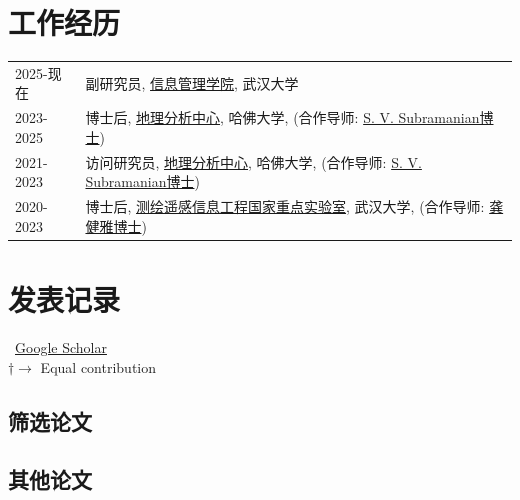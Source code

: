 \documentclass[11pt]{article}
\begin{document}
\section*{工作经历}
\label{exp_research}

\begin{longtable}[l]{@{}p{} p{}}

	2025-现在   & 副研究员, \href{https://sim.whu.edu.cn/}{信息管理学院}, 武汉大学                                                                                       \\

	2023-2025 & 博士后, \href{https://gis.harvard.edu/}{地理分析中心}, 哈佛大学, (合作导师: \href{https://gis.harvard.edu/people/s-v-subramanian}{S. V. Subramanian博士})   \\

	2021-2023 & 访问研究员, \href{https://gis.harvard.edu/}{地理分析中心}, 哈佛大学, (合作导师: \href{https://gis.harvard.edu/people/s-v-subramanian}{S. V. Subramanian博士}) \\

	2020-2023 & 博士后, \href{http://www.lmars.whu.edu.cn/en/}{测绘遥感信息工程国家重点实验室}, 武汉大学, (合作导师: \href{https://en.whu.edu.cn/info/1073/1568.htm}{龚健雅博士})       \\
\end{longtable}

\section*{发表记录}
\label{pubs}

\vspace{-.75em}
\small
{}~\href{https://scholar.google.com.hk/citations?user=H9RAbHIAAAAJ}{Google Scholar}\\
$\dagger \rightarrow$ Equal contribution
\normalsize

\subsection*{筛选论文}
\label{select-paper}
\newrefcontext[labelprefix=S]
\nocite{*}
\printbibliography[type=article, heading=none, resetnumbers=true, keyword=S]

\subsection*{其他论文}
\label{journal-article}
\newrefcontext[labelprefix=J]
\nocite{*}
\printbibliography[type=article, heading=none, resetnumbers=true, keyword=J]
\end{document}
